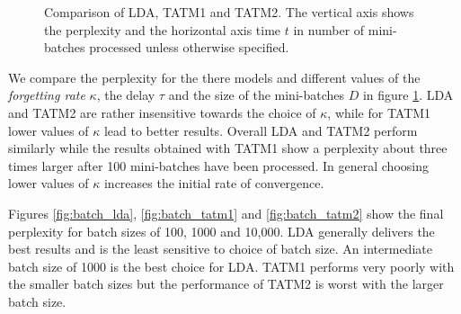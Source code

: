 \begin{figure}[ht]
{	\label{fig:batch_tatm2}
}
\caption[Optional caption for list of figures]{Comparison of LDA, TATM1 and TATM2. The vertical axis shows the perplexity and the horizontal axis time $t$ in number of mini-batches processed unless otherwise specified.}
\label{fig:evaluation}
\end{figure}
%
We compare the perplexity for the there models and different values of the \textit{forgetting rate} $\kappa$, the delay $\tau$ and the size of the mini-batches $D$ in figure \ref{fig:evaluation}. LDA and TATM2 are rather insensitive towards the choice of $\kappa$, while for TATM1 lower values of $\kappa$ lead to better results. Overall LDA and TATM2 perform similarly while the results obtained with TATM1 show a perplexity about three times larger after 100 mini-batches have been processed. In general choosing lower values of $\kappa$ increases the initial rate of convergence.

Figures \ref{fig:batch_lda}, \ref{fig:batch_tatm1} and \ref{fig:batch_tatm2} show the final perplexity for batch sizes of 100, 1000 and 10,000. LDA generally delivers the best results and is the least sensitive to choice of batch size. An intermediate batch size of 1000 is the best choice for LDA. TATM1 performs very poorly with the smaller batch sizes but the performance of TATM2 is worst with the larger batch size.

